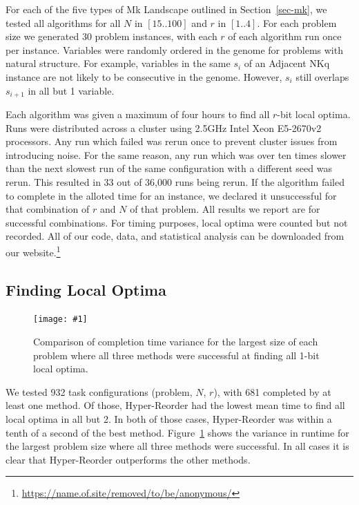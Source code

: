 \documentclass[runningheads,a4paper]{llncs}
\newcommand{\includegraphicsfit}[1]
{\texttt{[image: \#1]}}
\begin{document}
For each of the five types of Mk Landscape outlined in Section~\ref{sec-mk}, we tested all
algorithms for all $N$ in $[15..100]$ and $r$ in $[1..4]$. For each problem size we generated
30 problem instances, with each $r$ of each algorithm run once per instance. Variables were randomly
ordered in the genome for problems with natural structure. For example, variables in the same $s_i$
of an Adjacent NKq instance are not likely to be consecutive in the genome. However, $s_i$ still overlaps
$s_{i+1}$ in all but 1 variable.

Each algorithm was given a maximum of four hours to find all $r$-bit local optima.
Runs were distributed across a cluster using 2.5GHz Intel Xeon E5-2670v2 processors.
Any run which failed was rerun once to prevent cluster issues from introducing
noise. For the same reason, any run which was over ten times slower than the next slowest run of the
same configuration with a different seed was rerun. This resulted in 33 out of 36,000 runs being rerun.
If the algorithm failed to complete in the alloted time for an instance,
we declared it unsuccessful for that combination of $r$ and $N$ of that problem. All results
we report are for successful combinations. For timing purposes, local optima were counted but not
recorded. All of our code, data, and statistical analysis can be downloaded from our
website.\footnote{\url{https://name.of.site/removed/to/be/anonymous/}}

\subsection{Finding Local Optima}
\label{sec-1-bit-optima}

\begin{figure}
  \centering
  \includegraphicsfit{boxplot-method}
  \caption{Comparison of completion time variance for the largest size of each problem
           where all three methods were successful at finding all 1-bit local optima.}
  \label{fig-boxplot-method}
\end{figure}



We tested 932 task configurations (problem, $N$, $r$), with 681 completed by at least one method.
Of those, Hyper-Reorder had the lowest
mean time to find all local optima in all but 2. In both of those cases, Hyper-Reorder was within a tenth of a second
of the best method.
Figure~\ref{fig-boxplot-method} shows the variance in runtime for the largest problem size where all three methods
were successful. In all cases it is clear that Hyper-Reorder outperforms the other methods.
\end{document}
